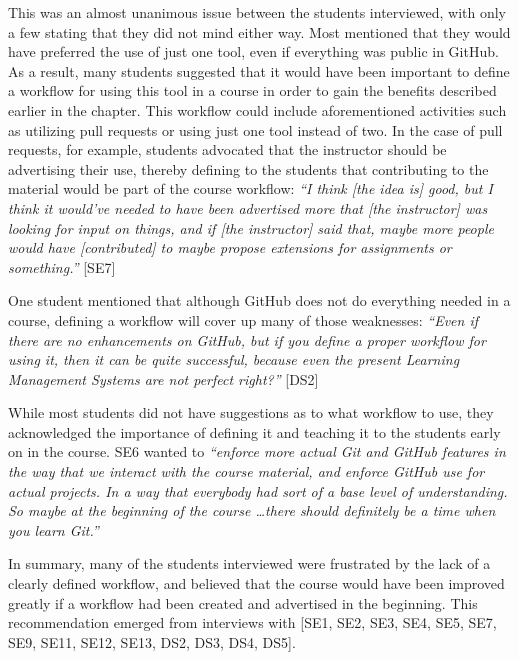 This was an almost unanimous issue between the students interviewed, with only a few stating that they did not mind either way. Most mentioned that they would have preferred the use of just one tool, even if everything was public in GitHub. As a result, many students suggested that it would have been important to define a workflow for using this tool in a course in order to gain the benefits described earlier in the chapter. This workflow could include aforementioned activities such as utilizing pull requests or using just one tool instead of two. In the case of pull requests, for example, students advocated that the instructor should be advertising their use, thereby defining to the students that contributing to the material would be part of the course workflow: \textit{``I think [the idea is] good, but I think it would've needed to have been advertised more that [the instructor] was looking for input on things, and if [the instructor] said that, maybe more people would have [contributed] to maybe propose extensions for assignments or something.''} [SE7]

One student mentioned that although GitHub does not do everything needed in a course, defining a workflow will cover up many of those weaknesses: \textit{``Even if there are no enhancements on GitHub, but if you define a proper workflow for using it, then it can be quite successful, because even the present Learning Management Systems are not perfect right?''} [DS2]

While most students did not have suggestions as to what workflow to use, they acknowledged the importance of defining it and teaching it to the students early on in the course. SE6 wanted to \textit{``enforce more actual Git and GitHub features in the way that we interact with the course material, and enforce GitHub use for actual projects. In a way that everybody had sort of a base level of understanding. So maybe at the beginning of the course \ldots there should definitely be a time when you learn Git.''}

In summary, many of the students interviewed were frustrated by the lack of a clearly defined workflow, and believed that the course would have been improved greatly if a workflow had been created and advertised in the beginning. This recommendation emerged from interviews with [SE1, SE2, SE3, SE4, SE5, SE7, SE9, SE11, SE12, SE13, DS2, DS3, DS4, DS5].


